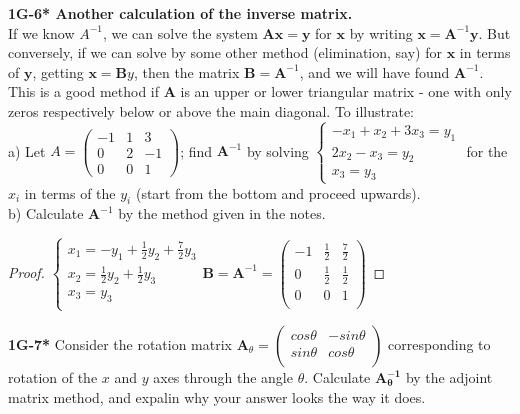 \documentclass{article}
\begin{document}
%
%
\textbf{1G-6* Another calculation of the inverse matrix.}
\\ If we know $A^{-1}$, we can solve the system $\mathbf{Ax} = \mathbf{y}$ for $\mathbf{x}$ by writing $\mathbf{x} = \mathbf{A}^{-1}\mathbf{y}$. But conversely, if we can solve by some other method (elimination, say) for $\mathbf{x}$ in terms of $\mathbf{y}$, getting $\mathbf{x} = \mathbf{B}y$, then the matrix $\mathbf{B} = \mathbf{A}^{-1}$, and we will have found $\mathbf{A}^{-1}$.
\\ This is a good method if $\mathbf{A}$ is an upper or lower triangular matrix - one with only zeros respectively below or above the main diagonal. To illustrate:
\\a) Let $A = \begin{pmatrix}
-1 & 1 & 3 \\
0 & 2 & -1 \\
0 & 0 & 1
\end{pmatrix}$; find $\mathbf{A}^{-1}$ by solving $\begin{cases}
-x_1 + x_2 + 3x_3 = y_1 \\
2x_2 - x_3 = y_2 \\
x_3 = y_3
\end{cases}$ for the $x_i$ in terms of the $y_i$ (start from the bottom and proceed upwards).
\\b) Calculate $\mathbf{A}^{-1}$ by the method given in the notes.
%
%
\begin{proof}
$
\begin{cases}
x_1 = -y_1 + \frac{1}{2} y_2 + \frac{7}{2} y_3 \\
x_2 = \frac{1}{2}y_2 + \frac{1}{2} y_3 \\
x_3 = y_3\\
\end{cases}
\mathbf{B} = \mathbf{A}^{-1} =
\begin{pmatrix}
-1 & \frac{1}{2} & \frac{7}{2} \\
0 & \frac{1}{2} & \frac{1}{2} \\
0 & 0 & 1 \\
\end{pmatrix}
$
\end{proof}
%
%
\textbf{1G-7*} Consider the rotation matrix $\mathbf{A}_{\theta} = \begin{pmatrix}
cos\theta & -sin\theta \\
sin\theta & cos\theta \\
\end{pmatrix}
$ corresponding to rotation of the $x$ and $y$ axes through the angle $\theta$. Calculate $\mathbf{A_{\theta}^{-1}}$ by the adjoint matrix method, and expalin why your answer looks the way it does.
\end{document}
